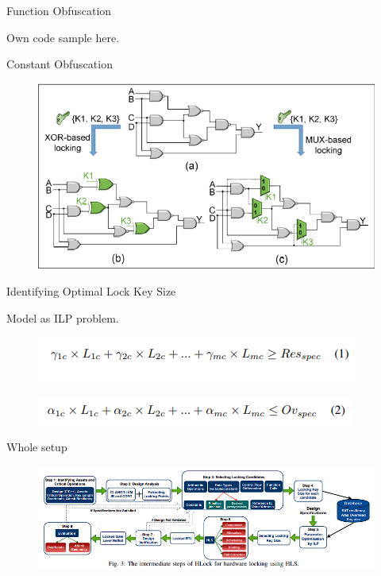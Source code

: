 \documentclass[xcolor=dvipsnames]{beamer}
\begin{document}
    \begin{frame}{Function Obfuscation}

        Own code sample here.
        
    \end{frame}

    \begin{frame}{Constant Obfuscation}

        \begin{figure}
            \includegraphics[scale=0.6]{XOR_Lock.PNG}
        \end{figure}
        
    \end{frame}

    \begin{frame}{Identifying Optimal Lock Key Size}

        Model as ILP problem. 
        \begin{figure}
            \includegraphics{Parameter1.PNG}
        \end{figure}

        \begin{figure}
            \includegraphics{Parameter2.PNG}
        \end{figure}
        
    \end{frame}

    \begin{frame}{Whole setup}

        \begin{figure}
            \includegraphics[scale=0.6]{HLockPipeline.PNG}
        \end{figure}
        
    \end{frame}
\end{document}
